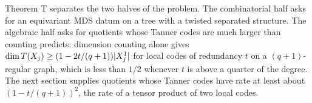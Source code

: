 Theorem T separates the two halves of the problem. The combinatorial half asks for an equivariant MDS datum on a tree
with a twisted separated structure. The algebraic half asks for quotients whose Tanner codes are much larger than
counting predicts: dimension counting alone gives $\dim T(X_j)\ge(1-2t/(q+1))\lvert X_j^1 \rvert$ for local codes of redundancy
$t$ on a $(q+1)$-regular graph, which is less than $1/2$ whenever $t$ is above a quarter of the degree. The next section
supplies quotients whose Tanner codes have rate at least about $(1-t/(q+1))^2$, the rate of a tensor product of two
local codes.
